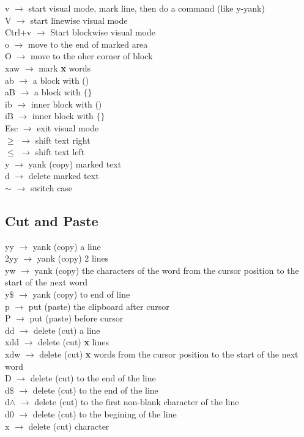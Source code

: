 \documentclass[twoside,a4paper]{article}
\newcommand{\tcc}{\color{cyan}}
\newcommand{\tcr}{\color{red}}
\newcommand{\tck}{\color{black}}
\newcommand{\ra }{$\rightarrow$ }
\begin{document}
\begin{multicols}{2}
		\tcr v \tck \ra start visual mode, mark
		line, then do a command (like y-yank)\\
		\tcr V \tck \ra start linewise visual 
		mode\\
		\tcr Ctrl+v \tck \ra Start blockwise 
		visual mode\\
		\tcr o \tck \ra move to the end of 
		marked area\\
		\tcr O \tck \ra move to the oher 
		corner of block\\
		\tcr xaw \tck \ra mark \textbf{x} 
		words\\
		\tcr ab \tck \ra a block with ()\\
		\tcr aB \tck \ra a block with $\{ \}$\\
		\tcr ib \tck \ra inner block with ()\\
		\tcr iB \tck \ra inner block with
		$\{ \}$\\
		\tcr Esc \tck \ra exit visual mode\\
		\tcr $ \geq $ \tck \ra shift text 
		right\\
		\tcr $\leq$ \tck \ra shift text left\\
		\tcr y \tck \ra yank (copy) marked 
		text\\
		\tcr d \tck \ra delete marked text\\
		\tcr $\sim$ \tck \ra switch case

	\tcc \subsection{Cut and Paste}

		\tcr yy \tck \ra yank (copy) a line\\
		\tcr 2yy \tck \ra yank (copy) 2 lines\\
		\tcr yw \tck \ra yank (copy) the 
		characters of the word from the cursor position to the start of
		the next word\\
		\tcr y$\$$ \tck \ra yank (copy) to end 
		of line\\
		\tcr p \tck \ra put (paste) the 
		clipboard after cursor\\
		\tcr P \tck \ra put (paste) before 
		cursor\\
		\tcr dd \tck \ra delete (cut) a line\\
		\tcr xdd \tck \ra delete (cut) 
		\textbf{x} lines\\
		\tcr xdw \tck \ra delete (cut) 
		\textbf{x} words from the cursor position to the start of the
		next word\\
		\tcr D \tck \ra delete (cut) to the end
		of the line\\
		\tcr d$\$$ \tck \ra delete (cut) to the
		end of the line\\
		\tcr d$\wedge$ \tck \ra delete (cut) 
		to the first non-blank character of the line\\
		\tcr d0 \tck \ra delete (cut) to the
		begining of the line\\
		\tcr x \tck \ra delete (cut) character


\end{multicols}
\end{document}
